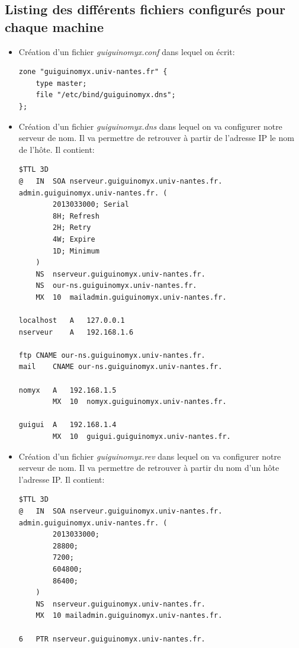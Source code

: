 \documentclass[a4paper,10pt]{article}
\begin{document}
\subsection{Listing des différents fichiers configurés pour chaque machine}
\begin{itemize}
\item Création d'un fichier \textit{guiguinomyx.conf} dans lequel on écrit:
\begin{lstlisting}
zone "guiguinomyx.univ-nantes.fr" {
	type master;
	file "/etc/bind/guiguinomyx.dns";
};
\end{lstlisting}
\item Création d'un fichier \textit{guiguinomyx.dns} dans lequel on va configurer notre serveur de nom. Il va permettre de retrouver à partir de l'adresse IP le nom de l'hôte. Il contient:
\begin{lstlisting}
$TTL 3D
@	IN	SOA	nserveur.guiguinomyx.univ-nantes.fr. admin.guiguinomyx.univ-nantes.fr. (
		2013033000; Serial
		8H; Refresh
		2H; Retry
		4W; Expire
		1D; Minimum
	)
	NS	nserveur.guiguinomyx.univ-nantes.fr.
	NS	our-ns.guiguinomyx.univ-nantes.fr.		
	MX	10	mailadmin.guiguinomyx.univ-nantes.fr.
		
localhost	A	127.0.0.1
nserveur	A	192.168.1.6

ftp	CNAME our-ns.guiguinomyx.univ-nantes.fr.
mail	CNAME our-ns.guiguinomyx.univ-nantes.fr.

nomyx	A	192.168.1.5
		MX	10	nomyx.guiguinomyx.univ-nantes.fr.

guigui	A	192.168.1.4
		MX	10	guigui.guiguinomyx.univ-nantes.fr.
\end{lstlisting}
\item Création d'un fichier \textit{guiguinomyx.rev} dans lequel on va configurer notre serveur de nom. Il va permettre de retrouver à partir du nom d'un hôte l'adresse IP. Il contient:
\begin{lstlisting}
$TTL 3D
@	IN	SOA	nserveur.guiguinomyx.univ-nantes.fr. admin.guiguinomyx.univ-nantes.fr. (
		2013033000;
		28800;
		7200;
		604800;
		86400;
	)
	NS	nserveur.guiguinomyx.univ-nantes.fr.		
	MX	10 mailadmin.guiguinomyx.univ-nantes.fr.

6	PTR	nserveur.guiguinomyx.univ-nantes.fr.


\end{lstlisting}
\end{itemize}
\end{document}
